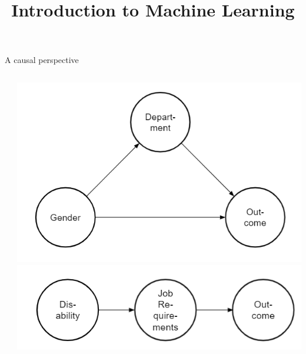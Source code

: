 


\newcommand{\learninggoals}{
\item XXXX
}


\title{Introduction to Machine Learning}
\date{}



\begin{vbframe}{A causal perspective}
\begin{columns}
\begin{column}{0.55\textwidth}
\end{column}
\begin{column}{0.45\textwidth}
\begin{center}
    \includegraphics[width=\textwidth]{figure_man/fair-dag.png}\\
    \includegraphics[width=\textwidth]{figure_man/fair-dag2.png}\\

\end{center}

\end{column}
\end{columns}





\end{vbframe}

